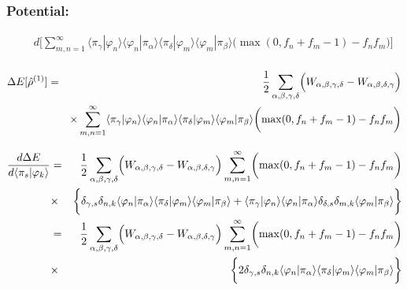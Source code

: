 \documentclass[11pt,a4paper]{report}
\begin{document}
\subsubsection{Potential:}

\begin{eqnarray}
&&d\biggl[
\sum_{m,n=1}^\infty
\langle\pi_\gamma|\varphi_n\rangle\langle\varphi_n|\pi_\alpha\rangle
\langle\pi_\delta|\varphi_m\rangle\langle\varphi_m|\pi_\beta\rangle
\biggl(\max(0,f_n+f_m-1)-f_nf_m\biggr)\biggr]
\nonumber\\
\end{eqnarray}

\begin{eqnarray}
\Delta{E}[\hat{\rho}^{(1)}]
&=&
\frac{1}{2}
\sum_{\alpha,\beta,\gamma,\delta} 
\Bigl(W_{\alpha,\beta,\gamma,\delta}-W_{\alpha,\beta,\delta,\gamma}\Bigr)
\nonumber\\
&&\times\sum_{m,n=1}^\infty
\langle\pi_\gamma|\varphi_n\rangle\langle\varphi_n|\pi_\alpha\rangle
\langle\pi_\delta|\varphi_m\rangle\langle\varphi_m|\pi_\beta\rangle
\biggl(\max(0,f_n+f_m-1)-f_nf_m\biggr)
\nonumber\\
\end{eqnarray}

\begin{eqnarray}
\frac{d\Delta{E}}{d\langle\pi_s|\varphi_k\rangle}
&=&
\frac{1}{2}
\sum_{\alpha,\beta,\gamma,\delta} 
\Bigl(W_{\alpha,\beta,\gamma,\delta}-W_{\alpha,\beta,\delta,\gamma}\Bigr)
\sum_{m,n=1}^\infty\biggl(\max(0,f_n+f_m-1)-f_nf_m\biggr)
\nonumber\\
&\times&
\biggl\lbrace
\delta_{\gamma,s}\delta_{n,k}
\langle\varphi_n|\pi_\alpha\rangle
\langle\pi_\delta|\varphi_m\rangle\langle\varphi_m|\pi_\beta\rangle
+
\langle\pi_\gamma|\varphi_n\rangle\langle\varphi_n|\pi_\alpha\rangle
\delta_{\delta,s}\delta_{m,k}\langle\varphi_m|\pi_\beta\rangle
\biggr\rbrace
\nonumber\\
&=&
\frac{1}{2}
\sum_{\alpha,\beta,\gamma,\delta} 
\Bigl(W_{\alpha,\beta,\gamma,\delta}-W_{\alpha,\beta,\delta,\gamma}\Bigr)
\sum_{m,n=1}^\infty\biggl(\max(0,f_n+f_m-1)-f_nf_m\biggr)
\nonumber\\
&\times&
\biggl\lbrace
2\delta_{\gamma,s}\delta_{n,k}
\langle\varphi_n|\pi_\alpha\rangle
\langle\pi_\delta|\varphi_m\rangle\langle\varphi_m|\pi_\beta\rangle
\biggr\rbrace
\nonumber\\
\end{eqnarray}
\end{document}
